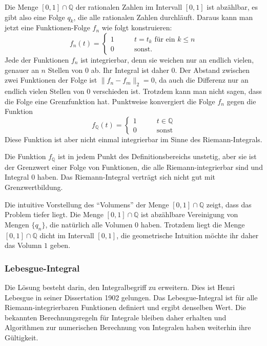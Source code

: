 \begin{beispiel}
Die Menge $[0,1]\cap \mathbb Q$ der rationalen Zahlen im Intervall
$[0,1]$ ist abzählbar, es gibt  also eine Folge $q_k$, die alle rationalen
Zahlen durchläuft.
Daraus kann man jetzt eine Funktionen-Folge $f_n$ wie folgt konstruieren:
\[
f_n(t) = \begin{cases} 
1&\qquad \text{$t=t_k$ für ein $k\le n$}\\
0&\qquad\text{sonst}.
\end{cases}
\]
Jede der Funktionen $f_n$ ist integrierbar, denn sie weichen nur an
endlich vielen, genauer an $n$ Stellen von $0$ ab.
Ihr Integral ist daher $0$.
Der Abstand zwischen zwei Funktionen der Folge ist $\| f_n-f_m\|_2 = 0$,
da auch die Differenz nur an endlich vielen Stellen von $0$ verschieden ist.
Trotzdem kann man nicht sagen, dass die Folge eine Grenzfunktion hat.
Punktweise konvergiert die Folge $f_n$ gegen die Funktion
\[
f_{\mathbb Q}(t) = \begin{cases}
1&\qquad t\in\mathbb Q\\
0&\qquad\text{sonst}
\end{cases}
\]
Diese Funktion ist aber nicht einmal integrierbar im Sinne des
Riemann-Integrals.
\end{beispiel}

Die Funktion $f_{\mathbb{Q}}$ ist in jedem Punkt des Definitionsbereichs
unstetig, aber sie ist der Grenzwert einer Folge von Funktionen, die
alle Riemann-integrierbar sind und Integral $0$ haben.
Das Riemann-Integral verträgt sich nicht gut mit Grenzwertbildung.

Die intuitive Vorstellung des ``Volumens'' der Menge 
$[0,1]\cap\mathbb{Q}$ zeigt, dass das Problem tiefer liegt.
Die Menge $[0,1]\cap\mathbb{Q}$ ist abzählbare Vereinigung von Mengen $\{q_n\}$,
die natürlich alle Volumen $0$ haben.
Trotzdem liegt die Menge $[0,1]\cap\mathbb{Q}$ dicht im Intervall $[0,1]$,
die geometrische Intuition möchte ihr daher das Volumn $1$ geben.

\subsubsection{Lebesgue-Integral}
%
%
Die Lösung besteht darin, den Integralbegriff zu erweitern.
Dies ist Henri Lebesgue in seiner Dissertation 1902 gelungen.
Das Lebesgue-Integral ist für alle Riemann-integrierbaren Funktionen
definiert und ergibt denselben Wert.
Die bekannten Berechnungsregeln für Integrale bleiben daher erhalten
und Algorithmen zur numerischen Berechnung von Integralen haben
weiterhin ihre Gültigkeit.

